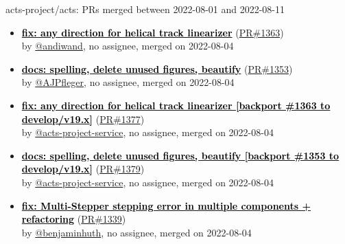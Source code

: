 \begin{frame}[allowframebreaks]{ acts-project/acts: PRs merged 
between 2022-08-01 and 2022-08-11
}
\begin{itemize}
    \item\prmerged
    \hspace*{0.1em}
    \textbf{\href{https://github.com/acts-project/acts/pull/1363}{\textcolor{black}{fix: any direction for helical track linearizer}}}
    (\href{https://github.com/acts-project/acts/pull/1363}{PR\#1363}) \\
    by \href{https://github.com/andiwand}{@andiwand}, {}no assignee, merged on 2022-08-04

    \item\prmerged
    \hspace*{0.1em}
    \textbf{\href{https://github.com/acts-project/acts/pull/1353}{\textcolor{black}{docs: spelling, delete unused figures, beautify}}}
    (\href{https://github.com/acts-project/acts/pull/1353}{PR\#1353}) \\
    by \href{https://github.com/AJPfleger}{@AJPfleger}, {}no assignee, merged on 2022-08-04

    \item\prmerged
    \hspace*{0.1em}
    \textbf{\href{https://github.com/acts-project/acts/pull/1377}{\textcolor{black}{fix: any direction for helical track linearizer [backport \#1363 to develop/v19.x]}}}
    (\href{https://github.com/acts-project/acts/pull/1377}{PR\#1377}) \\
    by \href{https://github.com/acts-project-service}{@acts-project-service}, {}no assignee, merged on 2022-08-04

    \item\prmerged
    \hspace*{0.1em}
    \textbf{\href{https://github.com/acts-project/acts/pull/1379}{\textcolor{black}{docs: spelling, delete unused figures, beautify [backport \#1353 to develop/v19.x]}}}
    (\href{https://github.com/acts-project/acts/pull/1379}{PR\#1379}) \\
    by \href{https://github.com/acts-project-service}{@acts-project-service}, {}no assignee, merged on 2022-08-04

    \item\prmerged
    \hspace*{0.1em}
    \textbf{\href{https://github.com/acts-project/acts/pull/1339}{\textcolor{black}{fix: Multi-Stepper stepping error in multiple components + refactoring}}}
    (\href{https://github.com/acts-project/acts/pull/1339}{PR\#1339}) \\
    by \href{https://github.com/benjaminhuth}{@benjaminhuth}, {}no assignee, merged on 2022-08-04


\end{itemize}
\end{frame}

